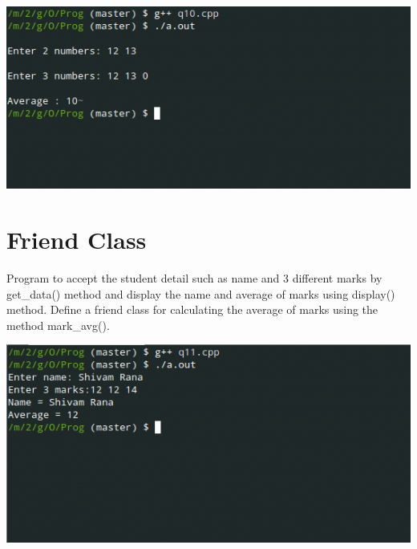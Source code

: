 \documentclass[oneside, a4paper,11pt]{book}
\begin{document}

\includegraphics[width=\textwidth]{q10.png}

\section{Friend Class}

Program to accept the student detail such as name and 3 different marks by get\_data() method and display the name and average of marks using display() method. Define a friend class for calculating the average of marks using the method mark\_avg().


\includegraphics[width=\textwidth]{q11.png}


\end{document}
